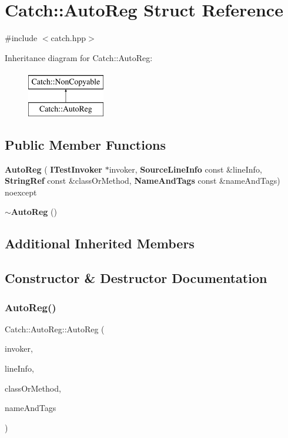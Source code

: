 \section{Catch\+::Auto\+Reg Struct Reference}
\label{struct_catch_1_1_auto_reg}


{\ttfamily \#include $<$catch.\+hpp$>$}

Inheritance diagram for Catch\+::Auto\+Reg\+:\begin{figure}[H]
\begin{center}
\leavevmode
\includegraphics[height=2.000000cm]{struct_catch_1_1_auto_reg}
\end{center}
\end{figure}
\subsection*{Public Member Functions}
\begin{DoxyCompactItemize}
\item 
\textbf{ Auto\+Reg} (\textbf{ I\+Test\+Invoker} $\ast$invoker, \textbf{ Source\+Line\+Info} const \&line\+Info, \textbf{ String\+Ref} const \&class\+Or\+Method, \textbf{ Name\+And\+Tags} const \&name\+And\+Tags) noexcept
\item 
\textbf{ $\sim$\+Auto\+Reg} ()
\end{DoxyCompactItemize}
\subsection*{Additional Inherited Members}


\subsection{Constructor \& Destructor Documentation}
\mbox{\label{struct_catch_1_1_auto_reg_a7eba02fb9d80b9896bf5a6517369af28}} 
\subsubsection{AutoReg()}
{\footnotesize\ttfamily Catch\+::\+Auto\+Reg\+::\+Auto\+Reg (\begin{DoxyParamCaption}\item[{\textbf{ I\+Test\+Invoker} $\ast$}]{invoker,  }\item[{\textbf{ Source\+Line\+Info} const \&}]{line\+Info,  }\item[{\textbf{ String\+Ref} const \&}]{class\+Or\+Method,  }\item[{\textbf{ Name\+And\+Tags} const \&}]{name\+And\+Tags }\end{DoxyParamCaption})\hspace{0.3cm}{\ttfamily [noexcept]}}

